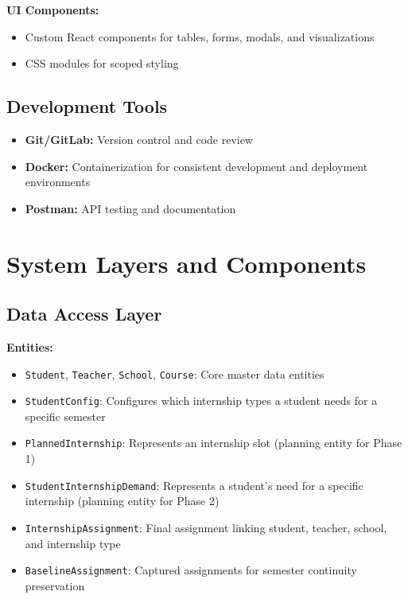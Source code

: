 \documentclass[12pt,a4paper]{report}
\begin{document}
\textbf{UI Components:}
\begin{itemize}
    \item Custom React components for tables, forms, modals, and visualizations
    \item CSS modules for scoped styling
\end{itemize}

\subsection{Development Tools}

\begin{itemize}
    \item \textbf{Git/GitLab:} Version control and code review
    \item \textbf{Docker:} Containerization for consistent development and deployment environments
    \item \textbf{Postman:} API testing and documentation
\end{itemize}

\section{System Layers and Components}

\subsection{Data Access Layer}

\textbf{Entities:}
\begin{itemize}
    \item \texttt{Student}, \texttt{Teacher}, \texttt{School}, \texttt{Course}: Core master data entities
    \item \texttt{StudentConfig}: Configures which internship types a student needs for a specific semester
    \item \texttt{PlannedInternship}: Represents an internship slot (planning entity for Phase 1)
    \item \texttt{StudentInternshipDemand}: Represents a student's need for a specific internship (planning entity for Phase 2)
    \item \texttt{InternshipAssignment}: Final assignment linking student, teacher, school, and internship type
    \item \texttt{BaselineAssignment}: Captured assignments for semester continuity preservation
\end{itemize}
\end{document}
